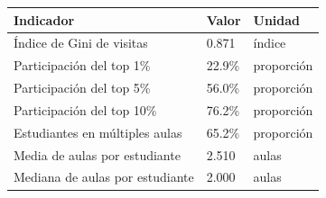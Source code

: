 \begin{tabularx}{\textwidth}{@{}>{\raggedright\arraybackslash}X l l@{}}
\toprule
Indicador & Valor & Unidad \\
\midrule
Índice de Gini de visitas & 0.871 & índice \\
Participación del top 1\% & 22.9\% & proporción \\
Participación del top 5\% & 56.0\% & proporción \\
Participación del top 10\% & 76.2\% & proporción \\
Estudiantes en múltiples aulas & 65.2\% & proporción \\
Media de aulas por estudiante & 2.510 & aulas \\
Mediana de aulas por estudiante & 2.000 & aulas \\
\bottomrule
\end{tabularx}
